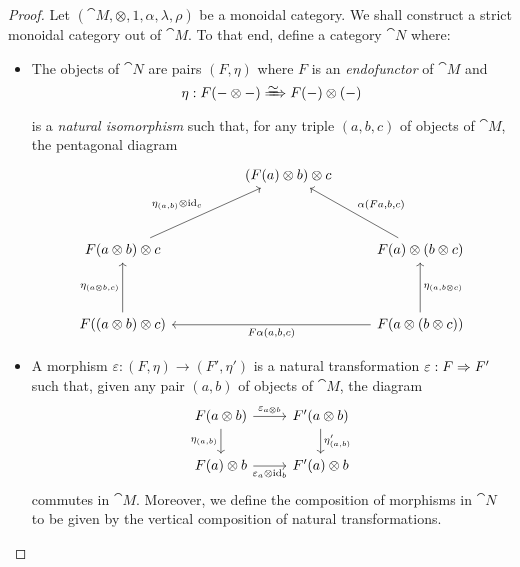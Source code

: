 \documentclass[../../deep-dive]{subfiles}
\begin{document}
\begin{proof}
    Let \((\cat M, \otimes, 1, \alpha, \lambda, \rho)\) be a monoidal
    category. We shall construct a strict monoidal category out of \(\cat M\). To
    that end, define a category \(\cat N\) where:
    \begin{itemize}\setlength\itemsep{0em}
        \item The objects of \(\cat N\) are pairs \((F, \eta)\) where \(F\) is an
              \emph{endofunctor} of \(\cat M\) and
              \[
                  \eta: F(- \otimes -) \isonat F(-) \otimes (-)
              \]
              is a \emph{natural isomorphism} such that, for any triple \((a, b, c)\) of
              objects of \(\cat M\), the pentagonal diagram
              \[
                  \begin{tikzcd}
                      &
                      &(F(a) \otimes b) \otimes c
                      &
                      \\
                      & & &
                      \\
                      F(a \otimes b) \otimes c
                      \ar[rruu, "\eta_{(a, b)} \otimes \Id_c"]
                      &
                      &
                      & F(a) \otimes (b \otimes c)
                      \ar[luu, "{\alpha(F a, b, c)}"']
                      \\
                      & & &
                      \\
                      F((a \otimes b) \otimes c)
                      \ar[uu, "\eta_{(a \otimes b, c)}"]
                      &
                      &
                      &F(a \otimes (b \otimes c))
                      \ar[lll, "{F \alpha(a, b, c)}"]
                      \ar[uu, "\eta_{(a, b \otimes c)}"']
                  \end{tikzcd}
              \]

        \item A morphism \(\varepsilon: (F, \eta) \to (F', \eta')\) is a natural
              transformation \(\varepsilon: F \Rightarrow F'\) such that, given any pair \((a, b)\)
              of objects of \(\cat M\), the diagram
              \begin{equation}\label{eq:coherence-morphism-cat-N}
                  \begin{tikzcd}
                      F(a \otimes b) \ar[d, "\eta_{(a, b)}"']
                      \ar[r, "\varepsilon_{a \otimes b}"]
                      &F'(a \otimes b) \ar[d, "\eta'_{(a, b)}"]
                      \\
                      F(a) \otimes b \ar[r, "\varepsilon_a \otimes \Id_b"']
                      &F'(a) \otimes b
                  \end{tikzcd}
              \end{equation}
              commutes in \(\cat M\). Moreover, we define the composition of morphisms in
              \(\cat N\) to be given by the vertical composition of natural transformations.


\end{itemize}
\end{proof}
\end{document}
